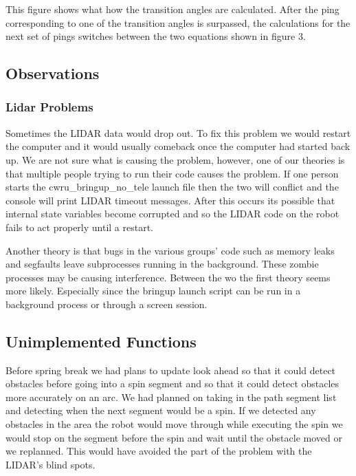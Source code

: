 This figure shows what how the transition angles are calculated.
After the ping corresponding to one of the transition angles is surpassed,
the calculations for the next set of pings switches between the two
equations shown in figure 3.

\subsection{Observations}

\subsubsection{Lidar Problems}

Sometimes the LIDAR data would drop out. To fix this problem we would restart the computer and it would usually comeback once the computer had started back up. We are not sure what is causing the problem, however, one of our theories is that multiple people trying to run their code causes the problem. If one person starts the cwru\_bringup\_no\_tele launch file then the two will conflict and the console will print LIDAR timeout messages. After this occurs its possible that internal state variables become corrupted and so the LIDAR code on the robot fails to act properly until a restart.

Another theory is that bugs in the various groups' code such as memory leaks and segfaults leave subprocesses running in the background. These zombie processes may be causing interference. Between the wo the first theory seems more likely. Especially since the bringup launch script can be run in a background process or through a screen session.

\subsection{Unimplemented Functions}

Before spring break we had plans to update look ahead so that it could detect obstacles before going into a spin segment and so that it could detect obstacles more accurately on an arc. We had planned on taking in the path segment list and detecting when the next segment would be a spin. If we detected any obstacles in the area the robot would move through while executing the spin we would stop on the segment before the spin and wait until the obstacle moved or we replanned. This would have avoided the part of the problem with the LIDAR's blind spots.

